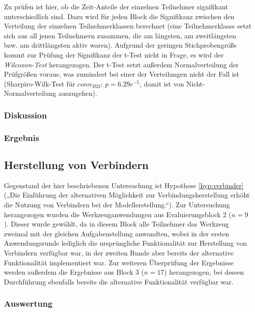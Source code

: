 Zu prüfen ist hier, ob die Zeit-Anteile der einzelnen Teilnehmer signifikant unterschiedlich sind. Dazu wird für jeden Block die Signifikanz zwischen den Verteilung der einzelnen Teilnehmerklassen berechnet (eine Teilnehmerklasse setzt sich aus all jenen Teilnehmern zusammen, die am längsten, am zweitlängsten bzw. am drittlängsten aktiv waren).  Aufgrund der geringen Stichprobengröße kommt zur Prüfung der Signifikanz der t-Test nicht in Frage, es wird der \emph{Wilcoxon-Test} herangezogen. Der t-Test setzt außerdem Normalverteilung der Prüfgrößen voraus, was zumindest bei einer der Verteilungen nicht der Fall ist (Sharpiro-Wilk-Test für $conn_{B22}$: $p=6.29e^{-5}$, damit ist von Nicht-Normalverteilung auszugehen).

\subsubsection{Diskussion} %

\subsubsection{Ergebnis} %


\subsection{Herstellung von Verbindern} %
\label{sub:herstellung_von_verbindern}

Gegenstand der hier beschriebenen Untersuchung ist Hypothese \ref{hyp:verbinder} („Die Einführung der alternativen Möglichkeit zur Verbindungsherstellung erhöht die Nutzung von Verbindern bei der Modellerstellung.“). Zur Untersuchung herangezogen wurden die Werkzeuganwendungen aus Evaluierungsblock 2 ($n=9$). Dieser wurde gewählt, da in diesem Block alle Teilnehmer das Werkzeug zweimal mit der gleichen Aufgabenstellung anwandten, wobei in der ersten Anwendungsrunde lediglich die ursprüngliche Funktionalität zur Herstellung von Verbindern verfügbar war, in der zweiten Runde aber bereits der alternative Funktionalität implementiert war. Zur weiteren Überprüfung der Ergebnisse werden außerdem die Ergebnisse aus Block 3 ($n=17$) herangezogen, bei dessen Durchführung ebenfalls bereits die alternative Funktionalität verfügbar war.

\subsubsection{Auswertung} %


